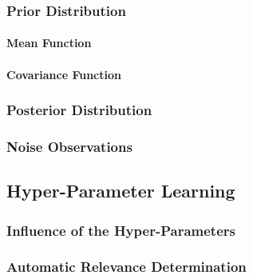            \subsubsection{Prior Distribution} %

                \paragraph{Mean Function} %

                \paragraph{Covariance Function} %

            \subsubsection{Posterior Distribution} %

            \subsubsection{Noise Observations} %

        \subsection{Hyper-Parameter Learning} %

            \subsubsection{Influence of the Hyper-Parameters} %

            \subsubsection{Automatic Relevance Determination} %

